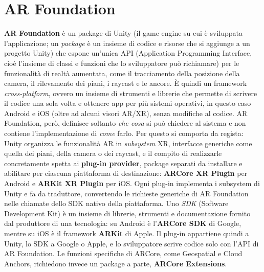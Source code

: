 \chapter{AR Foundation}
\textbf{AR Foundation}\cite{AR-Foundation-1}\cite{AR-Foundation-2}\cite{Unity-General} è un package di Unity (il game engine su cui è sviluppata l'applicazione; un \textit{package} è un insieme di codice e risorse che si aggiunge a un progetto Unity) che espone un'unica API (Application Programming Interface, cioè l'insieme di classi e funzioni che lo sviluppatore può richiamare) per le funzionalità di realtà aumentata, come il tracciamento della posizione della camera, il rilevamento dei piani, i raycast e le ancore. È quindi un framework \textit{cross-platform}, ovvero un insieme di strumenti e librerie che permette di scrivere il codice una sola volta e ottenere app per più sistemi operativi, in questo caso Android e iOS (oltre ad alcuni visori AR/XR), senza modifiche al codice. AR Foundation, però, definisce soltanto \textit{che cosa} si può chiedere al sistema e non contiene l'implementazione di \textit{come} farlo. Per questo si comporta da regista: Unity organizza le funzionalità AR in \textit{subsystem} XR, interfacce generiche come quella dei piani, della camera o dei raycast, e il compito di realizzarle concretamente spetta ai \textbf{plug-in provider}, package separati da installare e abilitare per ciascuna piattaforma di destinazione: \textbf{ARCore XR Plugin} per Android e \textbf{ARKit XR Plugin} per iOS. Ogni plug-in implementa i subsystem di Unity e fa da traduttore, convertendo le richieste generiche di AR Foundation nelle chiamate dello SDK nativo della piattaforma. Uno \textit{SDK} (Software Development Kit) è un insieme di librerie, strumenti e documentazione fornito dal produttore di una tecnologia: su Android è l'\textbf{ARCore SDK} di Google, mentre su iOS è il framework \textbf{ARKit} di Apple. Il plug-in appartiene quindi a Unity, lo SDK a Google o Apple, e lo sviluppatore scrive codice solo con l'API di AR Foundation. Le funzioni specifiche di ARCore, come Geospatial e Cloud Anchors, richiedono invece un package a parte, \textbf{ARCore Extensions}.

